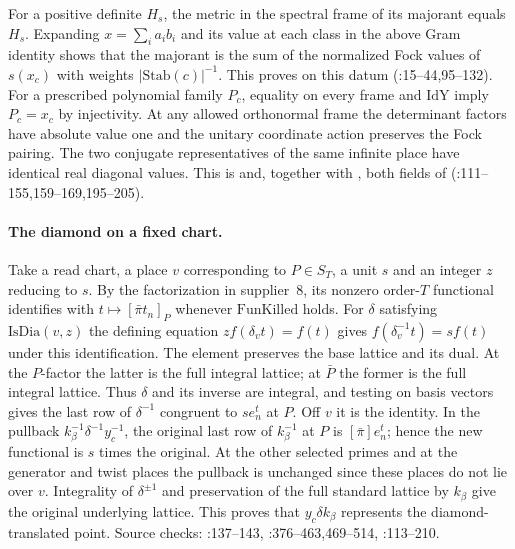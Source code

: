 For a positive definite $H_s$, the metric in the spectral frame of its
majorant equals $H_s$. Expanding $x=\sum_i a_i b_i$ and its value at
each class in the above Gram identity shows that the majorant is the sum
of the normalized Fock values of $s(x_c)$ with weights
$|\mathrm{Stab}(c)|^{-1}$. This proves  on this
datum (:15--44,95--132). For a prescribed
polynomial family $P_c$, equality on every frame and $\mathrm{IdY}$ imply
$P_c=x_c$ by injectivity. At any allowed orthonormal frame the determinant
factors have absolute value one and the unitary coordinate action preserves
the Fock pairing. The two conjugate representatives of the same infinite
place have identical real diagonal values. This is  and,
together with , both fields of
(:111--155,159--169,195--205).

\paragraph{The diamond on a fixed chart.}
Take a read chart, a place $v$ corresponding to $P\in S_T$, a unit $s$
and an integer $z$ reducing to $s$. By the factorization in supplier~8,
its nonzero order-$T$ functional identifies with
$t\mapsto[\bar\pi t_n]_P$ whenever $\mathrm{FunKilled}$ holds. For
$\delta$ satisfying $\mathrm{IsDia}(v,z)$ the defining equation
$z f(\delta_v t)=f(t)$ gives $f(\delta_v^{-1}t)=s f(t)$ under this
identification. The element preserves the base lattice and its dual.
At the $P$-factor the latter is the full integral lattice; at $\bar P$
the former is the full integral lattice. Thus $\delta$ and its inverse
are integral, and testing on basis vectors gives the last row of
$\delta^{-1}$ congruent to $s e_n^t$ at $P$. Off $v$ it is the identity.
In the pullback $k_\beta^{-1}\delta^{-1}y_c^{-1}$, the original last
row of $k_\beta^{-1}$ at $P$ is $[\bar\pi]e_n^t$; hence the new
functional is $s$ times the original. At the other selected primes
and at the generator and twist places the pullback is unchanged since
these places do not lie over $v$. Integrality of $\delta^{\pm1}$ and
preservation of the full standard lattice by $k_\beta$ give the original
underlying lattice. This proves that $y_c\delta k_\beta$ represents the
diamond-translated point. Source checks: :137--143,
:376--463,469--514,
:113--210.

